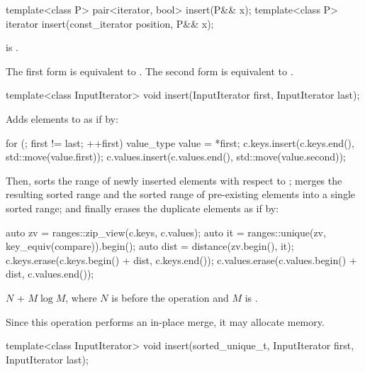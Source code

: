 %
\begin{itemdecl}
template<class P> pair<iterator, bool> insert(P&& x);
template<class P> iterator insert(const_iterator position, P&& x);
\end{itemdecl}

\begin{itemdescr}
\pnum
\constraints
{} is .

\pnum
\effects
The first form is equivalent to .
The second form is equivalent to
.
\end{itemdescr}

%
\begin{itemdecl}
template<class InputIterator>
  void insert(InputIterator first, InputIterator last);
\end{itemdecl}

\begin{itemdescr}
\pnum
\effects
Adds elements to  as if by:
\begin{codeblock}
for (; first != last; ++first) {
  value_type value = *first;
  c.keys.insert(c.keys.end(), std::move(value.first));
  c.values.insert(c.values.end(), std::move(value.second));
}
\end{codeblock}
Then, sorts the range of newly inserted elements
with respect to ;
merges the resulting sorted range and
the sorted range of pre-existing elements into a single sorted range; and
finally erases the duplicate elements as if by:
\begin{codeblock}
auto zv = ranges::zip_view(c.keys, c.values);
auto it = ranges::unique(zv, key_equiv(compare)).begin();
auto dist = distance(zv.begin(), it);
c.keys.erase(c.keys.begin() + dist, c.keys.end());
c.values.erase(c.values.begin() + dist, c.values.end());
\end{codeblock}

\pnum
\complexity
$N$ + $M \log M$,
where $N$ is  before the operation and
$M$ is .

\pnum
\remarks
Since this operation performs an in-place merge, it may allocate memory.
\end{itemdescr}

%
\begin{itemdecl}
template<class InputIterator>
  void insert(sorted_unique_t, InputIterator first, InputIterator last);
\end{itemdecl}

